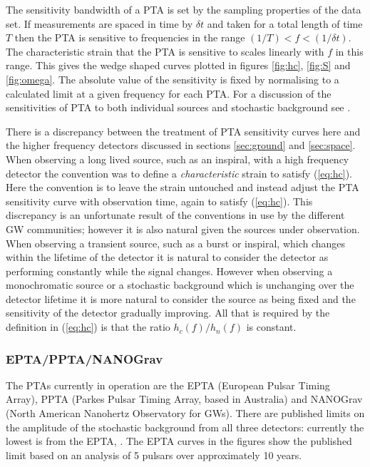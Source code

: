 The sensitivity bandwidth of a PTA is set by the sampling properties of the data set. If measurements are spaced in time by $\delta t$ and taken for a total length of time $T$ then the PTA is sensitive to frequencies in the range $(1/T)<f<(1/\delta t)$. The characteristic strain that the PTA is sensitive to scales linearly with $f$ in this range. This gives the wedge shaped curves plotted in figures \ref{fig:hc}, \ref{fig:S} and \ref{fig:omega}. The absolute value of the sensitivity is fixed by normalising to a calculated limit at a given frequency for each PTA. For a discussion of the sensitivities of PTA to both individual sources and stochastic background see \cite{MooreTaylorGair}.

There is a discrepancy between the treatment of PTA sensitivity curves here and the higher frequency detectors discussed in sections \ref{sec:ground} and \ref{sec:space}. When observing a long lived source, such as an inspiral, with a high frequency detector the convention was to define a \emph{characteristic} strain to satisfy (\ref{eq:hc}). Here the convention is to leave the strain untouched and instead adjust the PTA sensitivity curve with observation time, again to satisfy (\ref{eq:hc}). This discrepancy is an unfortunate result of the conventions in use by the different GW communities; however it is also natural given the sources under observation. When observing a transient source, such as a burst or inspiral, which changes within the lifetime of the detector it is natural to consider the detector as performing constantly while the signal changes. However when observing a monochromatic source or a stochastic background which is unchanging over the detector lifetime it is more natural to consider the source as being fixed and the sensitivity of the detector gradually improving. All that is required by the definition in (\ref{eq:hc}) is that the ratio $h_{c}(f)/h_{n}(f)$ is constant.



\subsubsection{EPTA/PPTA/NANOGrav}
The PTAs currently in operation are the EPTA (European Pulsar Timing Array), PPTA (Parkes Pulsar Timing Array, based in  Australia) and NANOGrav (North American Nanohertz Observatory for GWs). There are published limits on the amplitude of the stochastic background from all three detectors: currently the lowest is from the EPTA, \cite{Haasteren}. The EPTA curves in the figures show the  published limit based on an analysis of 5 pulsars over approximately 10 years.

